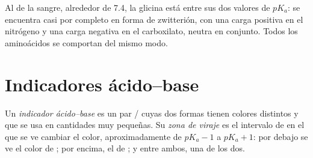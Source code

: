 \begin{example}\label{ex:g12:buffers-predominance:glycine}
Al  de la sangre, alrededor de 7.4, la glicina está entre sus dos
valores de $pK_a$: se encuentra casi por completo en forma de
zwitterión, con una carga positiva en el nitrógeno y una carga negativa
en el carboxilato, neutra en conjunto. Todos los aminoácidos se
comportan del mismo modo.
\end{example}

\section{Indicadores ácido--base}


\begin{definition}\label{def:g12:buffers-predominance:indicator}
Un \emph{indicador ácido--base} es un par
/ cuyas dos formas tienen colores distintos y que se
usa en cantidades muy pequeñas. Su \emph{zona de viraje}
es el intervalo de  en el que se ve cambiar el color, aproximadamente
de $pK_a - 1$ a $pK_a + 1$: por debajo se ve el color de ; por
encima, el de ; y entre ambos, una  de los dos.
\end{definition}

